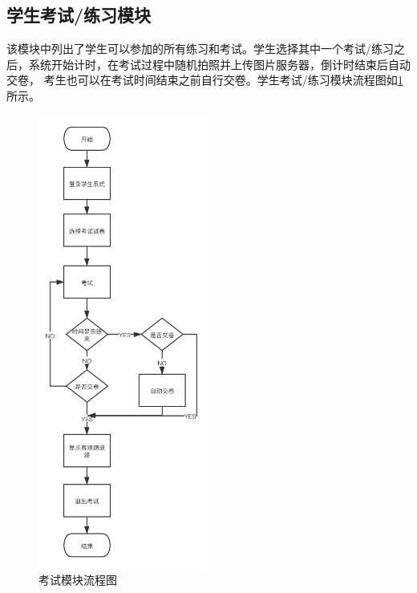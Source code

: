 \subsection{学生考试/练习模块}
该模块中列出了学生可以参加的所有练习和考试。学生选择其中一个考试/练习之后，系统开始计时，在考试过程中随机拍照并上传图片服务器，倒计时结束后自动交卷，
考生也可以在考试时间结束之前自行交卷。学生考试/练习模块流程图如\ref{figure:exam}所示。
\begin{figure}[H]
\centering
\includegraphics[width=0.5\textwidth,keepaspectratio]{data/chapter-5/exam.png}
\caption{考试模块流程图}
\label{figure:exam}
\end{figure}
